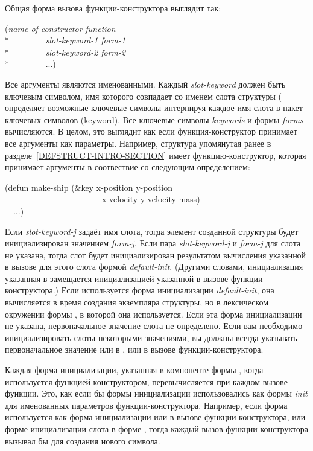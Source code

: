 Общая форма вызова функции-конструктора выглядит так:
\begin{lisp}
(\emph{name-of-constructor-function} \\*
~~~~~~~~\emph{slot-keyword-1} \emph{form-1} \\*
~~~~~~~~\emph{slot-keyword-2} \emph{form-2} \\*
~~~~~~~~...)
\end{lisp}
Все аргументы являются именованными. Каждый \emph{slot-keyword} должен
быть ключевым символом, имя которого совпадает со именем слота
структуры ( определяет возможные ключевые символы
интернируя каждое имя слота в пакет ключевых символов (keyword). Все
ключевые символы \emph{keywords} и формы \emph{forms} вычисляются. В
целом, это выглядит как если функция-конструктор принимает все
аргументы как  параметры. Например, структура 
упомянутая ранее в разделе~\ref{DEFSTRUCT-INTRO-SECTION} имеет
функцию-конструктор, которая принимает аргументы в соотвествие со
следующим определением:
\begin{lisp}
(defun make-ship (\&key x-position y-position \\
~~~~~~~~~~~~~~~~~~~~~~~x-velocity y-velocity mass) \\
~~...)
\end{lisp}

\label{defstruct-initialization}
Если \emph{slot-keyword-j} задаёт имя слота, тогда элемент созданной структуры
будет инициализирован значением \emph{form-j}.
Если пара \emph{slot-keyword-j} и \emph{form-j} для слота не указана, тогда слот
будет инициализирован результатом вычисления указанной в вызове 
для этого слота формой \emph{default-init}.
(Другими словами, инициализация указанная в  замещается
инициализацией указанной в вызове функции-конструктора.)
Если используется форма инициализации \emph{default-init}, она вычисляется в
время создания экземпляра структуры, но в лексическом окружении формы
, в которой она используется.
Если эта форма инициализации не указана, первоначальное значение слота не
определено.
Если вам необходимо инициализировать слоты некоторыми значениями, вы должны
всегда указывать первоначальное значение или в , или в 
вызове функции-конструктора. 

Каждая форма инициализации, указанная в компоненте формы , когда
используется функцией-конструктором, перевычисляется при каждом вызове
функции. Это, как если бы формы инициализации использовались как формы
\emph{init} для именованных параметров функции-конструктора.
Например, если форма  используется как форма инициализации или в
вызове функции-конструктора, или форме инициализации слота в форме
, тогда каждый вызов функции-конструктора вызывал бы 
для создания нового символа.

